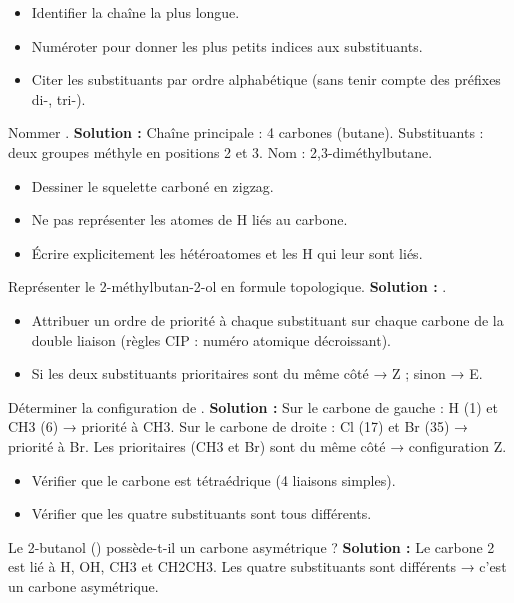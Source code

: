 \begin{itemize}
    \item Identifier la chaîne la plus longue.
    \item Numéroter pour donner les plus petits indices aux substituants.
    \item Citer les substituants par ordre alphabétique (sans tenir compte des préfixes di-, tri-).
\end{itemize}
\begin{exemple}
Nommer .
\noindent \textbf{Solution :} Chaîne principale : 4 carbones (butane). Substituants : deux groupes méthyle en positions 2 et 3. Nom : 2,3-diméthylbutane.
\end{exemple}

\begin{itemize}
    \item Dessiner le squelette carboné en zigzag.
    \item Ne pas représenter les atomes de H liés au carbone.
    \item Écrire explicitement les hétéroatomes et les H qui leur sont liés.
\end{itemize}
\begin{exemple}
Représenter le 2-méthylbutan-2-ol en formule topologique.
\noindent \textbf{Solution :} .
\end{exemple}

\begin{itemize}
    \item Attribuer un ordre de priorité à chaque substituant sur chaque carbone de la double liaison (règles CIP : numéro atomique décroissant).
    \item Si les deux substituants prioritaires sont du même côté → Z ; sinon → E.
\end{itemize}
\begin{exemple}
Déterminer la configuration de .
\noindent \textbf{Solution :} Sur le carbone de gauche : H (1) et CH3 (6) → priorité à CH3. Sur le carbone de droite : Cl (17) et Br (35) → priorité à Br. Les prioritaires (CH3 et Br) sont du même côté → configuration Z.
\end{exemple}

\begin{itemize}
    \item Vérifier que le carbone est tétraédrique (4 liaisons simples).
    \item Vérifier que les quatre substituants sont tous différents.
\end{itemize}
\begin{exemple}
Le 2-butanol () possède-t-il un carbone asymétrique ?
\noindent \textbf{Solution :} Le carbone 2 est lié à H, OH, CH3 et CH2CH3. Les quatre substituants sont différents → c'est un carbone asymétrique.
\end{exemple}

